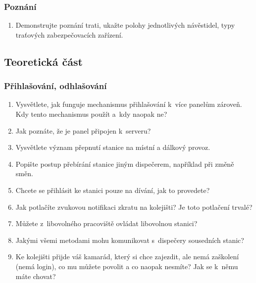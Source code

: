 \documentclass[12pt,a4paper]{article}
\begin{document}
\subsubsection*{Poznání}
\begin{enumerate}[leftmargin=*]
\item Demonstrujte poznání trati, ukažte polohy jednotlivých návěstidel, typy
traťových zabezpečovacích zařízení.
\end{enumerate}


\subsection{Teoretická část}

\subsubsection*{Přihlašování, odhlašování}
\begin{enumerate}[leftmargin=*]
\item Vysvětlete, jak funguje mechanismus přihlašování k~více panelům zároveň.
Kdy tento mechanismus použít a~kdy naopak ne?
\item Jak poznáte, že je panel připojen k~serveru?
\item Vysvětlete význam přepnutí stanice na místní a dálkový provoz.
\item Popište postup přebírání stanice jiným dispečerem, například při změně
směn.
\item Chcete se přihlásit ke stanici pouze na dívání, jak to provedete?
\item Jak potlačíte zvukovou notifikaci zkratu na kolejišti? Je toto potlačení
trvalé?
\item Můžete z~libovolného pracoviště ovládat libovolnou stanici?
\item Jakými všemi metodami mohu komunikovat s~dispečery sousedních stanic?
\item Ke kolejišti přijde váš kamarád, který si chce zajezdit, ale nemá
zaškolení (nemá login), co mu můžete povolit a co naopak nesmíte? Jak se k~němu
máte chovat?
\end{enumerate}
\end{document}
